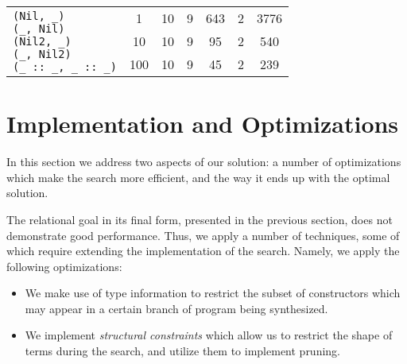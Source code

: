 \begin{table}[t]
\begin{tabular}{|m{3cm}|cc||cccc|}
    \\
        \hline
        \multirow{3}{*}{
          \parbox{3cm}{
            \vskip2mm
\lstinline[basicstyle=\scriptsize]|(Nil, _)|\\[-1mm]
\lstinline[basicstyle=\scriptsize]|(_, Nil)|\\[-1mm]
\lstinline[basicstyle=\scriptsize]|(Nil2, _)|\\[-1mm]
\lstinline[basicstyle=\scriptsize]|(_, Nil2)|\\[-1mm]
\lstinline[basicstyle=\scriptsize]|(_ :: _, _ :: _)|}}
         & 1&10&9&643&2&3776\\[3mm]
        \cline{2-7}
      &10&10&9&95&2&540\\[3mm]
        \cline{2-7}
     &100&10&9&45&2&239                    \\ \hline
  \end{tabular}

\end{table}


\section{Implementation and Optimizations}
\label{sec:optimization}

In this section we address two aspects of our solution: a number of optimizations which make the search more efficient, and
the way it ends up with the optimal solution.

The relational goal in its final form, presented in the previous section, does not demonstrate good performance. Thus, we apply a number
of techniques, some of which require extending the implementation of the search. Namely, we apply the following optimizations:

\begin{itemize}
\item We make use of type information to restrict the subset of constructors which may appear in a certain branch of
  program being synthesized.
\item We implement \emph{structural constraints} which allow us to restrict the shape of terms during the search, and
  utilize them to implement pruning.  
\end{itemize}

